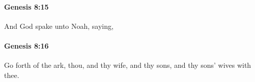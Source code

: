 		\paragraph{Genesis 8:15} %
			\label{GENESIS-8-15}

			And God spake unto Noah, saying,


		\paragraph{Genesis 8:16} %
			\label{GENESIS-8-16}

			Go forth of the ark, thou, and thy wife, and thy sons, and thy sons' wives with thee.


